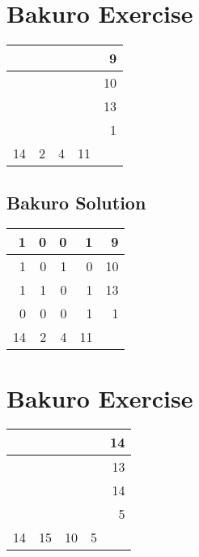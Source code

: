 \documentclass[]{article}
\begin{document}
\section{Bakuro Exercise}\begin{tabular}{rrrrr}
\hline
    &   &   &    &  9 \\ \hline
    &   &   &    & 10 \\ \hline
    &   &   &    & 13 \\ \hline
    &   &   &    &  1 \\ \hline
 14 & 2 & 4 & 11 &    \\ \hline
\hline
\end{tabular}\newpage 
 \subsection{Bakuro Solution} 
\begin{tabular}{rrrrr}
\hline
  1 & 0 & 0 &  1 &  9 \\ \hline
  1 & 0 & 1 &  0 & 10 \\ \hline
  1 & 1 & 0 &  1 & 13 \\ \hline
  0 & 0 & 0 &  1 &  1 \\ \hline
 14 & 2 & 4 & 11 &    \\ \hline
\hline
\end{tabular}\newpage\section{Bakuro Exercise}\begin{tabular}{rrrrr}
\hline
    &    &    &   & 14 \\ \hline
    &    &    &   & 13 \\ \hline
    &    &    &   & 14 \\ \hline
    &    &    &   &  5 \\ \hline
 14 & 15 & 10 & 5 &    \\ \hline
\hline
\end{tabular}\newpage 
\end{document}
